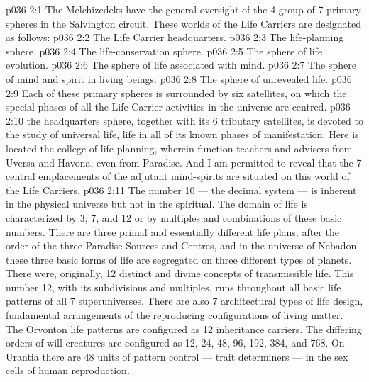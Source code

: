 \vs p036 2:1 The Melchizedeks have the general oversight of the 4 group of 7 primary spheres in the Salvington circuit. These worlds of the Life Carriers are designated as follows:
\vs p036 2:2 \bibnobreakspace The Life Carrier headquarters.
\vs p036 2:3 \bibnobreakspace The life\hyp{}planning sphere.
\vs p036 2:4 \bibnobreakspace The life\hyp{}conservation sphere.
\vs p036 2:5 \bibnobreakspace The sphere of life evolution.
\vs p036 2:6 \bibnobreakspace The sphere of life associated with mind.
\vs p036 2:7 \bibnobreakspace The sphere of mind and spirit in living beings.
\vs p036 2:8 \bibnobreakspace The sphere of unrevealed life.
\vs p036 2:9 \pc Each of these primary spheres is surrounded by six satellites, on which the special phases of all the Life Carrier activities in the universe are centred.
\vs p036 2:10 \pc {} the headquarters sphere, together with its 6 tributary satellites, is devoted to the study of universal life, life in all of its known phases of manifestation. Here is located the college of life planning, wherein function teachers and advisers from Uversa and Havona, even from Paradise. And I am permitted to reveal that the 7 central emplacements of the adjutant mind\hyp{}spirits are situated on this world of the Life Carriers.
\vs p036 2:11 The number 10 --- the decimal system --- is inherent in the physical universe but not in the spiritual. The domain of life is characterized by 3, 7, and 12 or by multiples and combinations of these basic numbers. There are three primal and essentially different life plans, after the order of the three Paradise Sources and Centres, and in the universe of Nebadon these three basic forms of life are segregated on three different types of planets. There were, originally, 12 distinct and divine concepts of transmissible life. This number 12, with its subdivisions and multiples, runs throughout all basic life patterns of all 7 superuniverses. There are also 7 architectural types of life design, fundamental arrangements of the reproducing configurations of living matter. The Orvonton life patterns are configured as 12 inheritance carriers. The differing orders of will creatures are configured as 12, 24, 48, 96, 192, 384, and 768. On Urantia there are 48 units of pattern control --- trait determiners --- in the sex cells of human reproduction.
